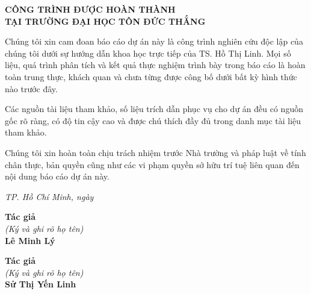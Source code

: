\newpage
\begin{center}
{\fontsize{16pt}{19.2pt}\selectfont \textbf{CÔNG TRÌNH ĐƯỢC HOÀN THÀNH \\TẠI TRƯỜNG ĐẠI HỌC TÔN ĐỨC THẮNG}\par}
\end{center}
\vspace{0.5cm}

Chúng tôi xin cam đoan báo cáo dự án này là công trình nghiên cứu độc lập của chúng tôi dưới sự hướng dẫn khoa học trực tiếp của TS. Hồ Thị Linh. Mọi số liệu, quá trình phân tích và kết quả thực nghiệm trình bày trong báo cáo là hoàn toàn trung thực, khách quan và chưa từng được công bố dưới bất kỳ hình thức nào trước đây.

Các nguồn tài liệu tham khảo, số liệu trích dẫn phục vụ cho dự án đều có nguồn gốc rõ ràng, có độ tin cậy cao và được chú thích đầy đủ trong danh mục tài liệu tham khảo. 

Chúng tôi xin hoàn toàn chịu trách nhiệm trước Nhà trường và pháp luật về tính chân thực, bản quyền cũng như các vi phạm quyền sở hữu trí tuệ liên quan đến nội dung báo cáo dự án này.

\vspace{0.5cm}
\begin{flushright}
\textit{TP. Hồ Chí Minh, ngày }
\end{flushright}

\vspace{0.3cm}
\noindent
\begin{minipage}[t]{0.48\textwidth}
    \centering
    \textbf{Tác giả} \\
    \textit{(Ký và ghi rõ họ tên)} \\
    \vspace{3cm}
    \textbf{Lê Minh Lý}
\end{minipage}
\hfill
\begin{minipage}[t]{0.48\textwidth}
    \centering
    \textbf{Tác giả} \\
    \textit{(Ký và ghi rõ họ tên)} \\
    \vspace{3cm}
    \textbf{Sử Thị Yến Linh}
\end{minipage}